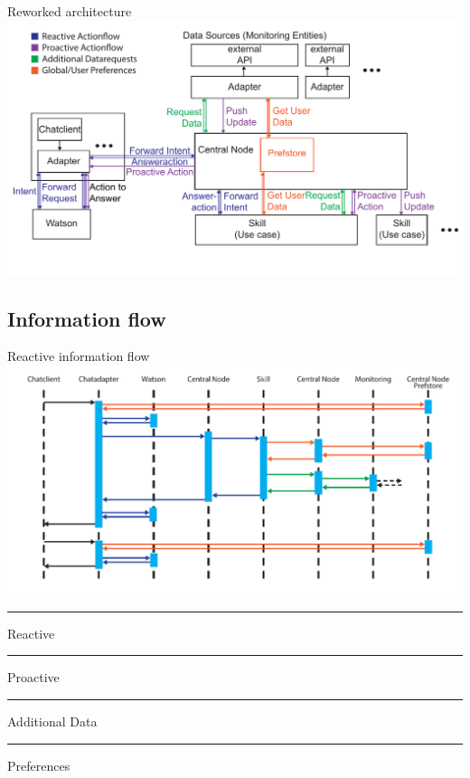 \documentclass[10pt]{beamer}
\newcommand\crule[3][black]{\textcolor{#1}{\rule{#2}{#3}}}
\begin{document}
\begin{frame}{Reworked architecture}
  \includegraphics[width=\textwidth]{architecture}
\end{frame}

\subsection{Information flow}

\begin{frame}{Reactive information flow}
  \includegraphics[width=\textwidth,page=1]{ProcessFlows}

  \crule[aswe-reactive]{0.2cm}{0.2cm} Reactive \hspace{0.3cm}
  \crule[aswe-proactive]{0.2cm}{0.2cm} Proactive \hspace{0.3cm}
  \crule[aswe-data]{0.2cm}{0.2cm} Additional Data \hspace{0.3cm}
  \crule[aswe-preferences]{0.2cm}{0.2cm} Preferences
  
\end{frame}
\end{document}
